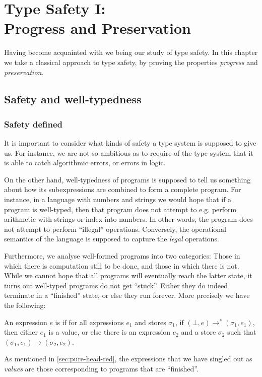 \chapter[Type safety I: Progress and preservation][Type safety I: Progress and preservation]{\vspace{-\baselineskip}Type Safety I:\\ Progress {\titlefontsmall and} Preservation}\label{chap:progress-preservation}

Having become acquainted with \langrecref{} we being our study of type safety. In this chapter we take a classical approach to type safety, by proving the properties \emph{progress} and \emph{preservation}.


\section{Safety and well-typedness}

\subsection{Safety defined}

It is important to consider what kinds of safety a type system is supposed to give us. For instance, we are not so ambitious as to require of the type system that it is able to catch algorithmic errors, or errors in logic.

On the other hand, well-typedness of programs is supposed to tell us something about how its subexpressions are combined to form a complete program. For instance, in a language with numbers and strings we would hope that if a program is well-typed, then that program does not attempt to e.g. perform arithmetic with strings or index into numbers. In other words, the program does not attempt to perform \enquote{illegal} operations. Conversely, the operational semantics of the language is supposed to capture the \emph{legal} operations.

Furthermore, we analyse well-formed programs into two categories: Those in which there is computation still to be done, and those in which there is not. While we cannot hope that all programs will eventually reach the latter state, it turns out well-typed programs do not get \enquote{stuck}. Either they do indeed terminate in a \enquote{finished} state, or else they run forever. More precisely we have the following:

\begin{definition}[Safety]
    \label{def:safety}
    An expression $e$ is  if for all expressions $e_1$ and stores $\sigma_1$, if $(\bot,e) \to^* (\sigma_1,e_1)$, then either $e_1$ is a value, or else there is an expression $e_2$ and a store $\sigma_2$ such that $(\sigma_1,e_1) \to (\sigma_2,e_2)$.
\end{definition}
%
As mentioned in \cref{sec:pure-head-red}, the expressions that we have singled out as \emph{values} are those corresponding to programs that are \enquote{finished}.


